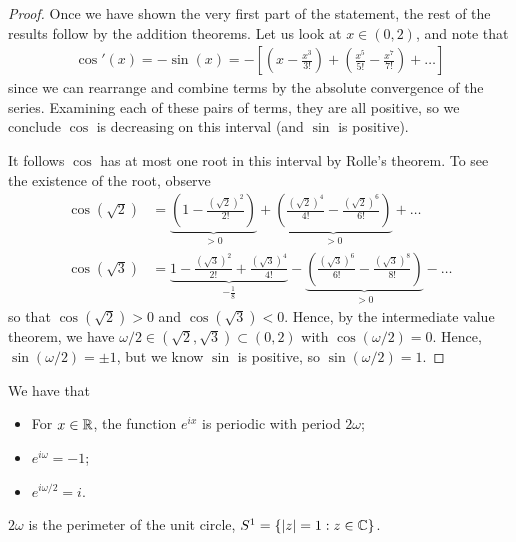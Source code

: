 \documentclass{../template/note}
\begin{document}
    \begin{proof}
        Once we have shown the very first part of the statement, the rest of the results follow by the addition theorems. Let us look at \(x \in (0, 2)\), and note that
        \begin{align*}
            \cos'(x) = -\sin(x) = -\left[\left(x-\frac{x^3}{3!}\right)+\left(\frac{x^5}{5!}-\frac{x^7}{7!}\right)+\dots\right]
        \end{align*}
        since we can rearrange and combine terms by the absolute convergence of the series. Examining each of these pairs of terms, they are all positive, so we conclude \(\cos\) is decreasing on this interval (and \(\sin\) is positive).

        It follows \(\cos\) has at most one root in this interval by Rolle's theorem. To see the existence of the root, observe
        \begin{align*}
            \cos(\sqrt 2) &= \underbrace{\left(1 - \frac{(\sqrt 2)^2}{2!}\right)}_{>0} + \underbrace{\left(\frac{(\sqrt 2)^4}{4!} - \frac{(\sqrt 2)^6}{6!}\right)}_{>0} + \dots \\
            \cos(\sqrt 3) &= \underbrace{1 - \frac{(\sqrt 3)^2}{2!} + \frac{(\sqrt 3)^4}{4!}}_{-\frac 1 8} - \underbrace{\left(\frac{(\sqrt 3)^6}{6!}-\frac{(\sqrt 3)^8}{8!}\right)}_{>0} - \dots
        \end{align*}
        so that \(\cos(\sqrt 2) > 0\) and \(\cos(\sqrt 3) < 0\). Hence, by the intermediate value theorem, we have \(\omega/2 \in (\sqrt 2, \sqrt 3) \subset (0, 2)\) with \(\cos(\omega/2) = 0\). Hence, \(\sin(\omega/2) = \pm 1\), but we know \(\sin\) is positive, so \(\sin(\omega/2)=1\).
    \end{proof}
    
    \begin{corollary}
        We have that
        \begin{itemize}
            \item For \(x \in \mathbb R\), the function \(e^{ix}\) is periodic with period \(2\omega\);
            \item \(e^{i\omega} = -1\);
            \item \(e^{i\omega/2} = i\).
        \end{itemize}
    \end{corollary}
    
    \begin{lemma}
        \(2\omega\) is the perimeter of the unit circle, \(S^1 = \{|z| = 1: z \in \mathbb C\}\).
    \end{lemma}
    
\end{document}
